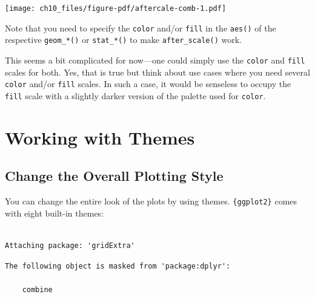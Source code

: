 \documentclass[
  letterpaper,
]{scrbook}
\begin{document}
\texttt{[image: ch10\_files/figure-pdf/aftercale-comb-1.pdf]}

Note that you need to specify the \texttt{color} and/or \texttt{fill} in
the \texttt{aes()} of the respective \texttt{geom\_*()} or
\texttt{stat\_*()} to make \texttt{after\_scale()} work.

\begin{tcolorbox}[enhanced jigsaw, toprule=.15mm, bottomtitle=1mm, coltitle=black, breakable, colbacktitle=quarto-callout-important-color!10!white, opacityback=0, toptitle=1mm, colframe=quarto-callout-important-color-frame, titlerule=0mm, title=\textcolor{quarto-callout-important-color}{\faExclamation}\hspace{0.5em}{Important}, bottomrule=.15mm, arc=.35mm, opacitybacktitle=0.6, leftrule=.75mm, left=2mm, rightrule=.15mm, colback=white]

This seems a bit complicated for now---one could simply use the
\texttt{color} and \texttt{fill} scales for both. Yes, that is true but
think about use cases where you need several \texttt{color} and/or
\texttt{fill} scales. In such a case, it would be senseless to occupy
the \texttt{fill} scale with a slightly darker version of the palette
used for \texttt{color}.

\end{tcolorbox}


\chapter{Working with Themes}\label{themes}

\section{Change the Overall Plotting
Style}\label{change-the-overall-plotting-style}

You can change the entire look of the plots by using themes.
\texttt{\{ggplot2\}} comes with eight built-in themes:

\begin{verbatim}

Attaching package: 'gridExtra'
\end{verbatim}

\begin{verbatim}
The following object is masked from 'package:dplyr':

    combine
\end{verbatim}
\end{document}
